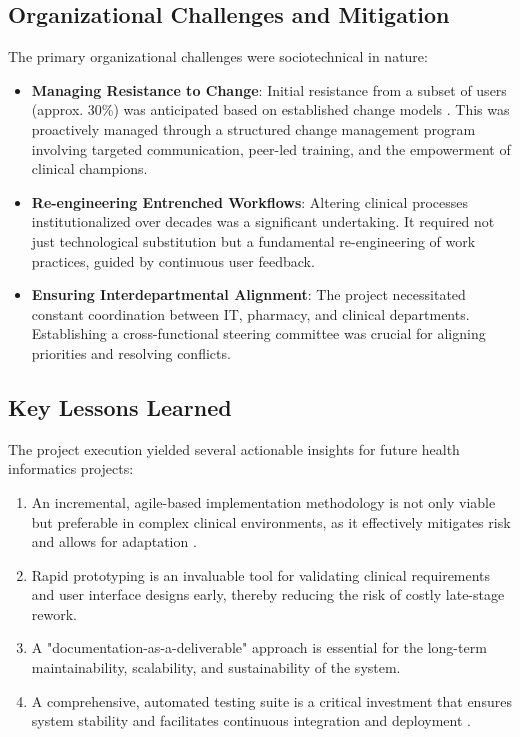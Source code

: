 \subsection{Organizational Challenges and Mitigation}

The primary organizational challenges were sociotechnical in nature:
\begin{itemize}
    \item \textbf{Managing Resistance to Change}: Initial resistance from a subset of users (approx. 30\%) was anticipated based on established change models \cite{rogers2003}. This was proactively managed through a structured change management program involving targeted communication, peer-led training, and the empowerment of clinical champions.
    \item \textbf{Re-engineering Entrenched Workflows}: Altering clinical processes institutionalized over decades was a significant undertaking. It required not just technological substitution but a fundamental re-engineering of work practices, guided by continuous user feedback.
    \item \textbf{Ensuring Interdepartmental Alignment}: The project necessitated constant coordination between IT, pharmacy, and clinical departments. Establishing a cross-functional steering committee was crucial for aligning priorities and resolving conflicts.
\end{itemize}

\subsection{Key Lessons Learned}
The project execution yielded several actionable insights for future health informatics projects:
\begin{enumerate}
    \item An incremental, agile-based implementation methodology is not only viable but preferable in complex clinical environments, as it effectively mitigates risk and allows for adaptation \cite{may2013}.
    \item Rapid prototyping is an invaluable tool for validating clinical requirements and user interface designs early, thereby reducing the risk of costly late-stage rework.
    \item A "documentation-as-a-deliverable" approach is essential for the long-term maintainability, scalability, and sustainability of the system.
    \item A comprehensive, automated testing suite is a critical investment that ensures system stability and facilitates continuous integration and deployment \cite{fowler2018}.
\end{enumerate}


